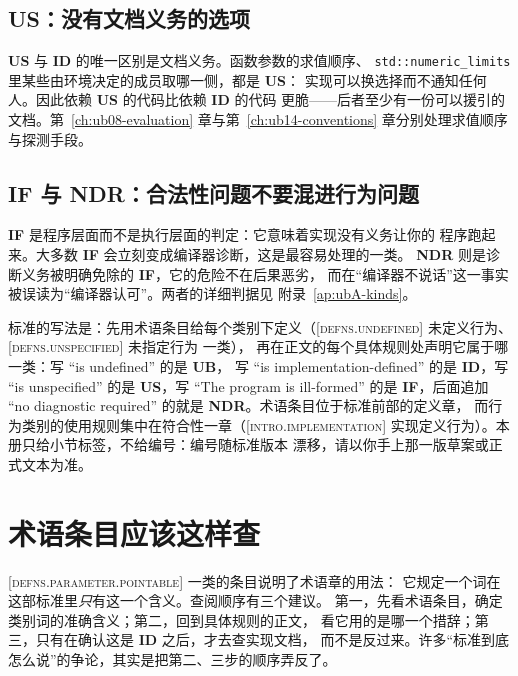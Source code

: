 \documentclass[12pt,a4paper,fontset=fandol]{ctexbook}
\newcommand{\Tp}[1]{\texttt{#1}}
\newcommand{\UB}{\textbf{\textsf{UB}}}
\newcommand{\IDB}{\textbf{\textsf{ID}}}
\newcommand{\USB}{\textbf{\textsf{US}}}
\newcommand{\NDR}{\textbf{\textsf{NDR}}}
\newcommand{\ILLF}{\textbf{\textsf{IF}}}
\newcommand{\Std}[1]{\textsc{[#1]}}
\newcommand{\Clause}[1]{\textsc{\small #1}}
\begin{document}
\subsection{US：没有文档义务的选项}\label{sec:ub01-usb}

\USB{} 与 \IDB{} 的唯一区别是文档义务。函数参数的求值顺序、
\Tp{std::numeric\_limits} 里某些由环境决定的成员取哪一侧，都是 \USB{}：
实现可以换选择而不通知任何人。因此依赖 \USB{} 的代码比依赖 \IDB{} 的代码
更脆——后者至少有一份可以援引的文档。第~\ref{ch:ub08-evaluation} 章与第~\ref{ch:ub14-conventions} 章分别处理求值顺序
与探测手段。

\subsection{IF 与 NDR：合法性问题不要混进行为问题}\label{sec:ub01-if-ndr}

\ILLF{} 是程序层面而不是执行层面的判定：它意味着实现没有义务让你的
程序跑起来。大多数 \ILLF{} 会立刻变成编译器诊断，这是最容易处理的一类。
\NDR{} 则是诊断义务被明确免除的 \ILLF{}，它的危险不在后果恶劣，
而在“编译器不说话”这一事实被误读为“编译器认可”。两者的详细判据见
附录~\ref{ap:ubA-kinds}。

\begin{clause}[title={标准怎么说：五个词的分工}]
标准的写法是：先用术语条目给每个类别下定义（\Std{defns.undefined}
\Clause{未定义行为}、\Std{defns.unspecified} \Clause{未指定行为} 一类），
再在正文的每个具体规则处声明它属于哪一类：写 “is undefined” 的是 \UB{}，
写 “is implementation-defined” 的是 \IDB{}，写 “is unspecified” 的是
\USB{}，写 “The program is ill-formed” 的是 \ILLF{}，后面追加
“no diagnostic required” 的就是 \NDR{}。术语条目位于标准前部的定义章，
而行为类别的使用规则集中在符合性一章（\Std{intro.implementation}
\Clause{实现定义行为}）。本册只给小节标签，不给编号：编号随标准版本
漂移，请以你手上那一版草案或正式文本为准。
\end{clause}

\section{术语条目应该这样查}\label{sec:ub01-defns}

\Std{defns.parameter.pointable} 一类的条目说明了术语章的用法：
它规定一个词在这部标准里\emph{只}有这一个含义。查阅顺序有三个建议。
第一，先看术语条目，确定类别词的准确含义；第二，回到具体规则的正文，
看它用的是哪一个措辞；第三，只有在确认这是 \IDB{} 之后，才去查实现文档，
而不是反过来。许多“标准到底怎么说”的争论，其实是把第二、三步的顺序弄反了。
\end{document}
